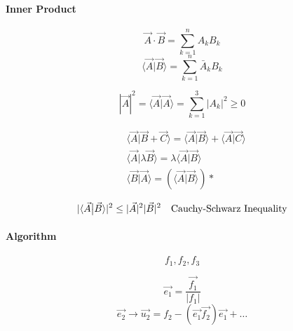 \documentclass[svgnames]{article}   	%
\begin{document}
\paragraph{Inner Product} 

\[
  \vec{A} \cdot \vec{B} = \sum_{k=1}^{n} A_k B_k 
\]
\[
\langle \vec{A} \big| \vec{B} \rangle = \sum_{k=1}^{n} \bar A_k B_k
\]

\[
|\vec{A}|^2 = \langle \vec{A} \big| \vec{A} \rangle = \sum_{k=1}^{3} |A_k|^2 \geq 0 
\]

\begin{align*}
  &\langle \vec{A} \big| \vec{B} + \vec{C} \rangle = \langle \vec{A} \big|
  \vec{B}\rangle + \langle \vec{A} \big| \vec{C}\rangle \\
  &\langle \vec{A} \big| \lambda \vec{B} \rangle = \lambda \langle \vec{A}
  \big| \vec{B} \rangle \\
  & \langle \vec{B} \big| \vec{A} \rangle = (\langle \vec{A} \big| \vec{B}
  \rangle )\ast
\end{align*}

\begin{align*}
  |\langle \vec{A} \big| \vec{B} \rangle |^2 \leq |\vec{A}|^2 |\vec{B}|^2 \hspace{10px}
  \text{Cauchy-Schwarz Inequality}
\end{align*}

\paragraph{Algorithm}

\[
f_1, f_2, f_3
\]

 \[
\vec{e_1} = \frac{\vec{f_1}}{|f_1|} 
\]
\[
\vec{e_2} \rightarrow \vec{u_2} = f_2 - (\vec{e_1}\vec{f_2})\vec{e_1} + \dots
\]
\end{document}
